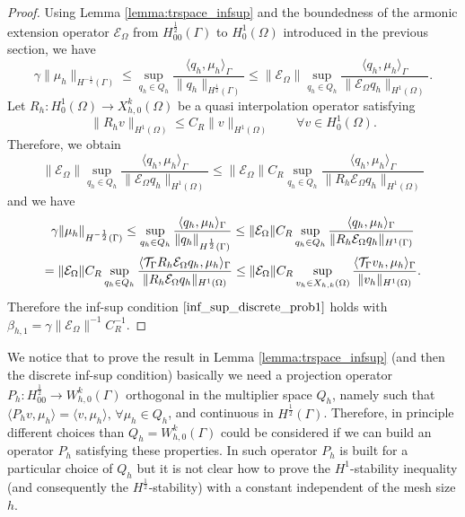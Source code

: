 \begin{proof}
Using Lemma \ref{lemma:trspace_infsup} and the boundedness of the armonic extension operator $\mathcal{E}_{\Omega}$ from $H^{\frac 12}_{00}(\Gamma)$ to $H^1_0(\Omega)$ introduced in the previous section, we have
\begin{equation*}
\gamma \|\mu_h\|_{H^{-\frac 12}(\Gamma)} \leq  \sup_{q_h \in Q_h} \frac{ \langle q_h, \mu_h \rangle _{\Gamma} } {\|q_h\|_{H^{\frac 12}(\Gamma)}} 
\leq 
\|\mathcal{E}_{\Omega}\| \sup_{q_h \in Q_h} \frac{ \langle q_h, \mu_h \rangle _{\Gamma} } {\|\mathcal{E}_\Omega q_h\|_{H^1(\Omega)}} .
\end{equation*}
Let $R_h: H^1_0(\Omega) \rightarrow X_{h,0}^k(\Omega)$ be a quasi interpolation operator satisfying 
\begin{equation*}
\|R_h v\|_{H^1(\Omega)} \leq C_R \|v\|_{H^1(\Omega)} \qquad \forall v \in H^1_0(\Omega).
\end{equation*}
Therefore, we obtain 
\begin{equation*}
\|\mathcal{E}_{\Omega}\| \sup_{q_h \in Q_h} \frac{ \langle q_h, \mu_h \rangle _{\Gamma} } {\|\mathcal{E}_{\Omega}q_h\|_{H^1(\Omega)}} 
\leq
\|\mathcal{E}_{\Omega}\| C_R \sup_{q_h \in Q_h} \frac{ \langle q_h, \mu_h \rangle _{\Gamma} } {\|R_h \mathcal{E}_{\Omega} q_h\|_{H^1(\Omega)}}
\end{equation*}
and we have
\begin{multline}
\gamma \|\mu_h\|_{H^{-\frac 12}(\Gamma)} 
\leq 
\sup_{q_h \in Q_h} \frac{ \langle q_h, \mu_h \rangle_{\Gamma} } {\|q_h\|_{H^{\frac 12}(\Gamma)}} 
\leq
\|\mathcal{E}_{\Omega}\| C_R \sup_{q_h \in Q_h} \frac{ \langle q_h, \mu_h \rangle_{\Gamma} } {\|R_h \mathcal{E}_{\Omega} q_h\|_{H^1(\Gamma)}}
\\
=
\|\mathcal{E}_{\Omega}\| C_R \sup_{q_h \in Q_h} \frac{ \langle {\mathcal{T}_\Gamma} R_h  \mathcal{E}_{\Omega}q_h, \mu_h \rangle_{\Gamma} } {\|R_h \mathcal{E}_{\Omega} q_h\|_{H^1(\Omega)}} 
\leq \|\mathcal{E}_{\Omega}\| C_R \sup_{v_h \in X_{h,k}(\Omega)} \frac{ \langle {\mathcal{T}_\Gamma} v_h, \mu_h \rangle_{\Gamma} } {\|v_h\|_{H^1(\Omega)}}. 
\end{multline}
Therefore the inf-sup condition $\eqref{inf_sup_discrete_prob1}$ holds with $\beta_{h,1} = \gamma \|\mathcal{E}_{\Omega}\|^{-1} C_R^{-1} $.
\end{proof}

\begin{remark} We notice that to prove the result in Lemma \ref{lemma:trspace_infsup} (and then the discrete inf-sup condition)  basically we need a projection operator $P_h: H^{\frac 12}_{00} \longrightarrow W_{h,0}^k(\Gamma)$ orthogonal in the multiplier space $Q_h$, namely such that $\langle P_h v, \mu_h \rangle = \langle v, \mu_h \rangle, \, \forall \mu_h \in Q_h$, and continuous in $H^{\frac 12}(\Gamma)$. Therefore, in principle different choices than $Q_h=W_{h,0}^k(\Gamma)$ could be considered if we can build an operator $P_h$ satisfying these properties. In \cite{belgacem1999mortar} such operator $P_h$  is built for a particular choice of $Q_h$ but it is not clear how to prove the $H^1$-stability inequality (and consequently the $H^{\frac 12 }$-stability) with a constant independent of the mesh size $h$.
\end{remark}  

